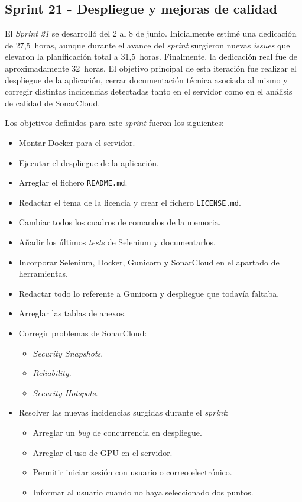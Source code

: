 \subsection{Sprint 21 - Despliegue y mejoras de calidad}
El \textit{Sprint 21} se desarrolló del 2 al 8 de junio. Inicialmente estimé una dedicación de 27,5~horas, aunque durante el avance del \textit{sprint} surgieron nuevas \textit{issues} que elevaron la planificación total a 31,5~horas. Finalmente, la dedicación real fue de aproximadamente 32~horas. El objetivo principal de esta iteración fue realizar el despliegue de la aplicación, cerrar documentación técnica asociada al mismo y corregir distintas incidencias detectadas tanto en el servidor como en el análisis de calidad de SonarCloud.

Los objetivos definidos para este \textit{sprint} fueron los siguientes:
\begin{itemize}
	\item Montar Docker para el servidor.
	\item Ejecutar el despliegue de la aplicación.
	\item Arreglar el fichero \texttt{README.md}.
	\item Redactar el tema de la licencia y crear el fichero \texttt{LICENSE.md}.
	\item Cambiar todos los cuadros de comandos de la memoria.
	\item Añadir los últimos \textit{tests} de Selenium y documentarlos.
	\item Incorporar Selenium, Docker, Gunicorn y SonarCloud en el apartado de herramientas.
	\item Redactar todo lo referente a Gunicorn y despliegue que todavía faltaba.
	\item Arreglar las tablas de anexos.
	\item Corregir problemas de SonarCloud:
	\begin{itemize}
		\item \textit{Security Snapshots}.
		\item \textit{Reliability}.
		\item \textit{Security Hotspots}.
	\end{itemize}
	\item Resolver las nuevas incidencias surgidas durante el \textit{sprint}:
	\begin{itemize}
		\item Arreglar un \textit{bug} de concurrencia en despliegue.
		\item Arreglar el uso de GPU en el servidor.
		\item Permitir iniciar sesión con usuario o correo electrónico.
		\item Informar al usuario cuando no haya seleccionado dos puntos.
	\end{itemize}
\end{itemize}

